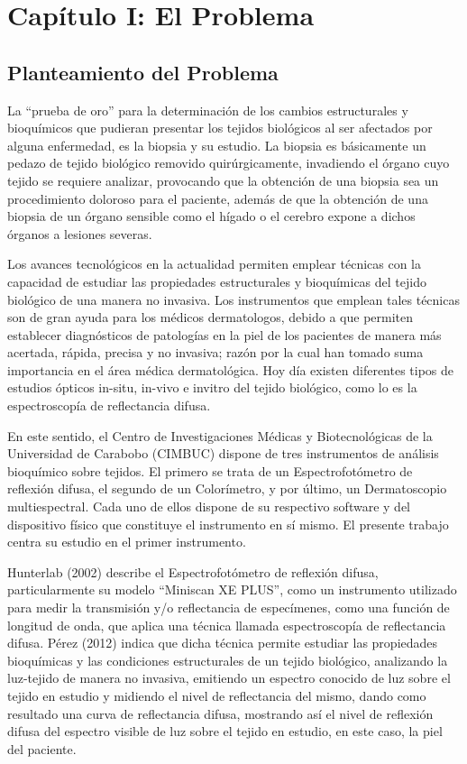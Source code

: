 \documentclass[12pt, a4paper]{article}
\begin{document}
\section{Cap\'{i}tulo I: El Problema}

\subsection{Planteamiento del Problema}
La ``prueba de oro'' para la determinaci\'{o}n de los cambios estructurales y bioqu\'{i}micos que pudieran presentar  los  tejidos  biol\'{o}gicos  al  ser  afectados  por  alguna  enfermedad, es la biopsia y su estudio. La  biopsia  es b\'{a}sicamente un pedazo  de tejido biol\'{o}gico removido quir\'{u}rgicamente, invadiendo el  \'{o}rgano  cuyo  tejido  se  requiere  analizar,  provocando  que  la  obtenci\'{o}n  de  una  biopsia  sea  un procedimiento  doloroso  para  el  paciente,  adem\'{a}s  de que la  obtenci\'{o}n  de una  biopsia  de  un  \'{o}rgano sensible como el h\'{i}gado o el cerebro expone a dichos \'{o}rganos a lesiones  severas.

Los avances tecnol\'{o}gicos en la actualidad permiten emplear t\'{e}cnicas con la capacidad de estudiar  las propiedades estructurales y bioqu\'{i}micas del tejido biol\'{o}gico de una manera no invasiva. Los instrumentos que emplean tales t\'{e}cnicas son de gran ayuda para los m\'{e}dicos dermatologos, debido a que permiten establecer diagn\'{o}sticos de patolog\'{i}as en la piel de los pacientes de manera m\'{a}s acertada, r\'{a}pida, precisa y no invasiva; raz\'{o}n por la cual han tomado suma importancia en el \'{a}rea m\'{e}dica dermatol\'{o}gica. Hoy d\'{i}a existen diferentes tipos de estudios \'{o}pticos in-situ, in-vivo e invitro del tejido biol\'{o}gico, como lo es la espectroscop\'{i}a de reflectancia difusa.

En este sentido, el Centro de Investigaciones M\'{e}dicas y Biotecnol\'{o}gicas de la Universidad de Carabobo (CIMBUC) dispone de tres instrumentos de an\'{a}lisis bioqu\'{i}mico sobre tejidos. El primero se trata de un Espectrofot\'{o}metro de reflexi\'{o}n difusa, el segundo de un Color\'{i}metro, y por \'{u}ltimo, un Dermatoscopio multiespectral. Cada uno de ellos dispone de su respectivo software y del dispositivo f\'{i}sico que constituye el instrumento en s\'{i} mismo. El presente trabajo centra su estudio en el primer instrumento.

Hunterlab (2002) describe el Espectrofot\'{o}metro de reflexi\'{o}n difusa, particularmente su modelo ``Miniscan XE PLUS'', como un instrumento utilizado para medir la transmisi\'{o}n y/o reflectancia de espec\'{i}menes, como una funci\'{o}n de longitud de onda, que aplica una t\'{e}cnica llamada espectroscop\'{i}a de reflectancia difusa. P\'{e}rez (2012) indica que dicha t\'{e}cnica permite estudiar las propiedades bioqu\'{i}micas y las condiciones estructurales de un tejido biol\'{o}gico, analizando la luz-tejido de manera no invasiva, emitiendo un espectro conocido de luz sobre el tejido en estudio y midiendo el nivel de reflectancia del mismo, dando como resultado una curva de reflectancia difusa, mostrando as\'{i} el nivel de reflexi\'{o}n difusa del espectro visible de luz sobre el tejido en estudio, en este caso, la piel del paciente.
\end{document}
